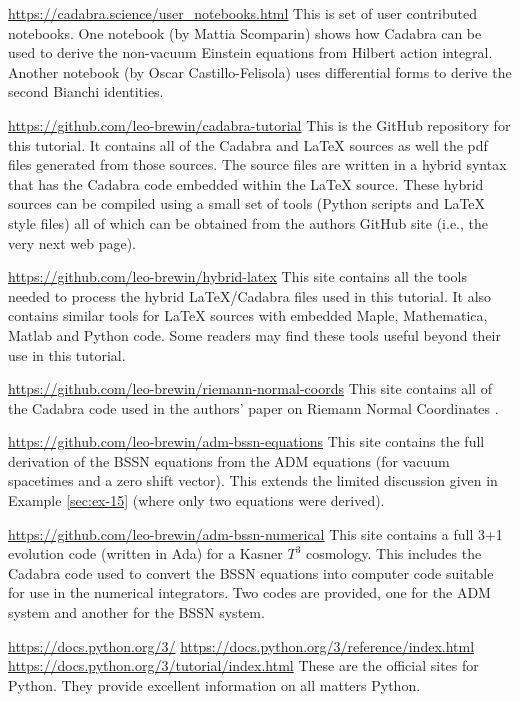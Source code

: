 \documentclass[a4paper,12pt]{article}
\numberwithin{equation}{section}%
\begin{document}
\url{https://cadabra.science/user_notebooks.html}\Break
This is set of user contributed notebooks. One notebook (by Mattia Scomparin) shows how
Cadabra can be used to derive the non-vacuum Einstein equations from Hilbert action
integral. Another notebook (by Oscar Castillo-Felisola) uses differential forms to derive
the second Bianchi identities.

\url{https://github.com/leo-brewin/cadabra-tutorial}\Break
This is the GitHub repository for this tutorial. It contains all of the Cadabra and LaTeX
sources as well the pdf files generated from those sources. The source files are written in
a hybrid syntax that has the Cadabra code embedded within the LaTeX source. These hybrid
sources can be compiled using a small set of tools (Python scripts and LaTeX style files)
all of which can be obtained from the authors GitHub site (i.e., the very next web page).

\url{https://github.com/leo-brewin/hybrid-latex}\Break
This site contains all the tools needed to process the hybrid LaTeX/Cadabra files used
in this tutorial. It also contains similar tools for LaTeX sources with embedded Maple,
Mathematica, Matlab and Python code. Some readers may find these tools useful beyond their
use in this tutorial.

\url{https://github.com/leo-brewin/riemann-normal-coords}\Break
This site contains all of the Cadabra code used in the authors' paper on Riemann Normal
Coordinates \cite{brewin:2009-02}.

\url{https://github.com/leo-brewin/adm-bssn-equations}\Break
This site contains the full derivation of the BSSN equations from the ADM equations (for
vacuum spacetimes and a zero shift vector). This extends the limited discussion given
in Example \ref{sec:ex-15} (where only two equations were derived).

\url{https://github.com/leo-brewin/adm-bssn-numerical}\Break
This site contains a full 3+1 evolution code (written in Ada) for a Kasner $T^3$ cosmology.
This includes the Cadabra code used to convert the BSSN equations into computer code
suitable for use in the numerical integrators. Two codes are provided, one for the ADM
system and another for the BSSN system.

\url{https://docs.python.org/3/}\Break
\url{https://docs.python.org/3/reference/index.html}\Break
\url{https://docs.python.org/3/tutorial/index.html}\Break
These are the official sites for Python. They provide excellent information on all matters
Python.
\end{document}
